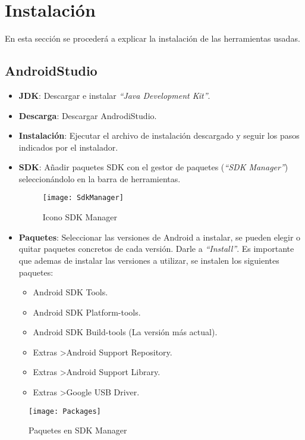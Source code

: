 		
\newpage	
\section{Instalación}
	En esta sección se procederá a explicar la instalación de las herramientas usadas.

	\subsection{AndroidStudio}
		\begin{itemize}
			\item {\bf JDK}: Descargar e instalar {\it ``Java Development Kit''}\cite{17:jdk:online}.
			\item {\bf Descarga}: Descargar AndrodiStudio\cite{13:androidstudiodescarga:online}.
			\item {\bf Instalación}: Ejecutar el archivo de instalación descargado y seguir los pasos indicados por el instalador.
			\item {\bf SDK}: Añadir paquetes SDK con el gestor de paquetes ({\em ``SDK Manager''}) seleccionándolo en la barra de herramientas.
				\begin{figure}[h]
					\centering
					\texttt{[image: SdkManager]}
					\caption{Icono SDK Manager}
					\label{fig:SdkManager}
				\end{figure}
			\item {\bf Paquetes}: Seleccionar las versiones de Android\cite{2:android:online} a instalar, se pueden elegir o quitar paquetes concretos de cada versión. Darle a {\em ``Install''}. Es importante que ademas de instalar las versiones a utilizar, se instalen los siguientes paquetes:
				\begin{itemize}
					\item Android SDK Tools.
					\item Android SDK Platform-tools.
					\item Android SDK Build-tools (La versión más actual).
					\item Extras \textgreater Android Support Repository.
					\item Extras \textgreater Android Support Library.
					\item Extras \textgreater Google USB Driver.
				\end{itemize}
		\end{itemize}
		
		\begin{figure}[h]
			\centering
			\texttt{[image: Packages]}
			\caption{Paquetes en SDK Manager}
			\label{fig:SdkManagerPackages}
		\end{figure}
		
